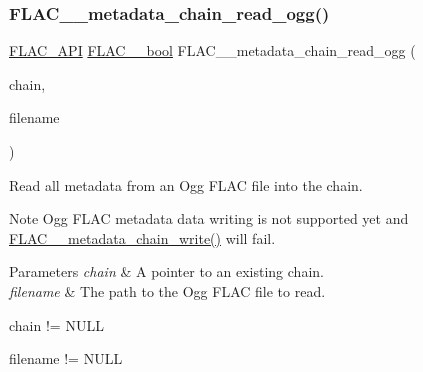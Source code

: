 \subsubsection{\texorpdfstring{F\+L\+A\+C\+\_\+\+\_\+metadata\+\_\+chain\+\_\+read\+\_\+ogg()}{FLAC\_\_metadata\_chain\_read\_ogg()}}
{\footnotesize\ttfamily \hyperlink{group__flac__export_ga56ca07df8a23310707732b1c0007d6f5}{F\+L\+A\+C\+\_\+\+A\+PI} \hyperlink{ordinals_8h_a95103469f1cbd78b8cf250194985b34e}{F\+L\+A\+C\+\_\+\+\_\+bool} F\+L\+A\+C\+\_\+\+\_\+metadata\+\_\+chain\+\_\+read\+\_\+ogg (\begin{DoxyParamCaption}\item[{\hyperlink{group__flac__metadata__level2_gaec6993c60b88f222a52af86f8f47bfdf}{F\+L\+A\+C\+\_\+\+\_\+\+Metadata\+\_\+\+Chain} $\ast$}]{chain,  }\item[{\hyperlink{zconf_8h_a2c212835823e3c54a8ab6d95c652660e}{const} char $\ast$}]{filename }\end{DoxyParamCaption})}

Read all metadata from an Ogg F\+L\+AC file into the chain.

\begin{DoxyNote}{Note}
Ogg F\+L\+AC metadata data writing is not supported yet and \hyperlink{group__flac__metadata__level2_gaa15ead7230217de8e79f4af822cda490}{F\+L\+A\+C\+\_\+\+\_\+metadata\+\_\+chain\+\_\+write()} will fail.
\end{DoxyNote}

\begin{DoxyParams}{Parameters}
{\em chain} & A pointer to an existing chain. \\
\hline
{\em filename} & The path to the Ogg F\+L\+AC file to read.  
\begin{DoxyCode}
chain != NULL 
\end{DoxyCode}
 
\begin{DoxyCode}
filename != NULL 
\end{DoxyCode}
 \\
\hline
\end{DoxyParams}

